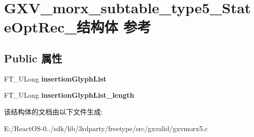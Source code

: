 \hypertarget{struct_g_x_v__morx__subtable__type5___state_opt_rec__}{}\section{G\+X\+V\+\_\+morx\+\_\+subtable\+\_\+type5\+\_\+\+State\+Opt\+Rec\+\_\+结构体 参考}
\label{struct_g_x_v__morx__subtable__type5___state_opt_rec__}
\subsection*{Public 属性}
\begin{DoxyCompactItemize}
\item 
\mbox{\label{struct_g_x_v__morx__subtable__type5___state_opt_rec___a3a7fee04dd37e0bb5a78cdf1e1a985a1}} 
F\+T\+\_\+\+U\+Long {\bfseries insertion\+Glyph\+List}
\item 
\mbox{\label{struct_g_x_v__morx__subtable__type5___state_opt_rec___a51a84135507a12da64b8b6d1835d4aef}} 
F\+T\+\_\+\+U\+Long {\bfseries insertion\+Glyph\+List\+\_\+length}
\end{DoxyCompactItemize}


该结构体的文档由以下文件生成\+:\begin{DoxyCompactItemize}
\item 
E\+:/\+React\+O\+S-\/0../sdk/lib/3rdparty/freetype/src/gxvalid/gxvmorx5.\+c\end{DoxyCompactItemize}
